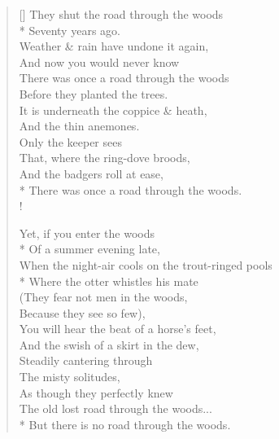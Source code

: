 \documentclass[MAIN]{subfiles}
\begin{document}
\settowidth{\versewidth}{There was once a road through the woods}
\begin{verse}[\versewidth]
They shut the road through the woods\\*
Seventy years ago.\\
Weather \& rain have undone it again,\\
And now you would never know\\
There was once a road through the woods\\
Before they planted the trees.\\
It is underneath the coppice \& heath,\\
And the thin anemones.\\
Only the keeper sees\\
That, where the ring-dove broods,\\
And the badgers roll at ease,\\*
There was once a road through the woods.\\!

Yet, if you enter the woods\\*
Of a summer evening late,\\
When the night-air cools on the trout-ringed pools\\*
Where the otter whistles his mate\\
(They fear not men in the woods,\\
Because they see so few),\\
You will hear the beat of a horse's feet,\\
And the swish of a skirt in the dew,\\
Steadily cantering through\\
The misty solitudes,\\
As though they perfectly knew\\
The old lost road through the woods...\\*
But there is no road through the woods.
\end{verse}
\end{document}
